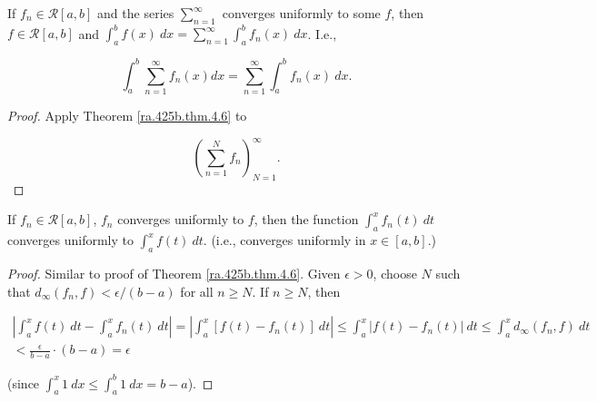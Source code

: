 \begin{corollary}

If \(f_n \in \mathcal{R}[a,b]\) and the series \(\sum_{n=1}^\infty\) converges uniformly to some \(f\), then \(f \in \mathcal{R}[a,b] \) and \(\int_a^b f(x) \ dx = \sum_{n=1}^\infty \int_a^b f_n(x) \ dx\). I.e.,

\[
\int_a^b \sum_{n=1}^\infty f_n(x) dx = \sum_{n=1}^\infty \int_a^b f_n(x) \ dx.
\]

\end{corollary}

\begin{proof}

Apply Theorem \ref{ra.425b.thm.4.6} to 

\[
\left( \sum_{n=1}^N f_n \right)_{N=1}^\infty.
\]

\end{proof}

\begin{corollary}

If \(f_n \in \mathcal{R}[a,b]\), \(f_n\) converges uniformly to \(f\), then the function \(\int_a^x f_n(t) \ dt \) converges uniformly to \(\int_a^x f(t) \ dt\). (i.e., converges uniformly in \(x \in [a,b]\).)

\end{corollary}

\begin{proof}

Similar to proof of Theorem \ref{ra.425b.thm.4.6}. Given \(\epsilon >0\), choose \(N\) such that \(d_\infty(f_n, f) < \epsilon/(b-a)\) for all \(n \geq N\). If \(n \geq N\), then 

\begin{multline*}
\left|  \int_a^x f(t) \ dt - \int_a^x f_n(t) \ dt \right| = \left|  \int_a^x [f(t) - f_n(t)] \ dt \right|  \leq  \int_a^x  \left|  f(t) - f_n(t) \right| \ dt   \leq  \int_a^x d_\infty(f_n, f)  \ dt 
\\  < \frac{\epsilon}{b-a} \cdot(b-a) = \epsilon
\end{multline*}

(since \(\int_a^x 1 \ dx \leq \int_a^b 1 \ dx = b-a\)).

\end{proof}











